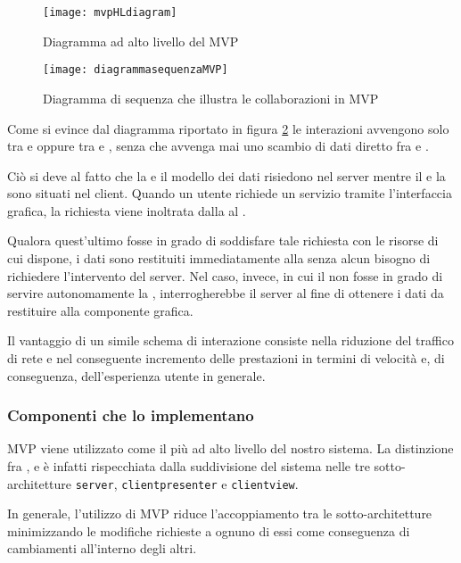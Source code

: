 \begin{figure}[H]
  \centering
  \texttt{[image: mvpHLdiagram]}
  \caption{Diagramma ad alto livello del  MVP}\label{fig:mvpHL}
\end{figure}

\begin{figure}[H]
  \centering
  \texttt{[image: diagrammasequenzaMVP]}
  \caption{Diagramma di sequenza che illustra le collaborazioni in MVP}\label{fig:mvpSD}
\end{figure}

Come si evince dal diagramma riportato in figura \ref{fig:mvpSD} le interazioni avvengono solo tra  e  oppure tra  e , senza che avvenga mai uno scambio di dati diretto fra  e .

Ciò si deve al fatto che la  e il modello dei dati risiedono nel server mentre il  e la  sono situati nel client. Quando un utente richiede un servizio tramite l'interfaccia grafica, la richiesta viene inoltrata dalla  al .

Qualora quest'ultimo fosse in grado di soddisfare tale richiesta con le risorse di cui dispone, i dati sono restituiti immediatamente alla  senza alcun bisogno di richiedere l'intervento del server. Nel caso, invece, in cui il  non fosse in grado di servire autonomamente la , interrogherebbe il server al fine di ottenere i dati da restituire alla componente grafica.

Il vantaggio di un simile schema di interazione consiste nella riduzione del traffico di rete e nel conseguente incremento delle prestazioni in termini di velocità e, di conseguenza, dell'esperienza utente in generale.

\subsubsection{Componenti che lo implementano}
MVP viene utilizzato come il  più ad alto livello del nostro sistema. La distinzione fra ,  e  è infatti rispecchiata dalla suddivisione del sistema nelle tre sotto-architetture \texttt{server}, \texttt{clientpresenter} e \texttt{clientview}.

In generale, l'utilizzo di MVP riduce l'accoppiamento tra le sotto-architetture minimizzando le modifiche richieste a ognuno di essi come conseguenza di cambiamenti all'interno degli altri.

